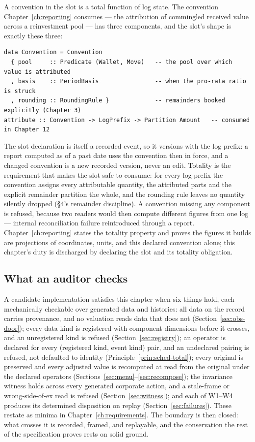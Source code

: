 A convention in the slot is a total function of log state. The convention
Chapter~\ref{ch:reporting} consumes --- the attribution of commingled received value across
a reinvestment pool --- has three components, and the slot's shape is exactly these three:

\begin{lstlisting}
data Convention = Convention
  { pool     :: Predicate (Wallet, Move)   -- the pool over which value is attributed
  , basis    :: PeriodBasis                -- when the pro-rata ratio is struck
  , rounding :: RoundingRule }             -- remainders booked explicitly (Chapter 3)
attribute :: Convention -> LogPrefix -> Partition Amount   -- consumed in Chapter 12
\end{lstlisting}

The slot declaration is itself a recorded event, so it versions with the log prefix: a
report computed as of a past date uses the convention then in force, and a changed
convention is a new recorded version, never an edit. Totality is the requirement that makes
the slot safe to consume: for every log prefix the convention assigns every attributable
quantity, the attributed parts and the explicit remainder partition the whole, and the
rounding rule leaves no quantity silently dropped (\S 4's remainder discipline). A
convention missing any component is refused, because two readers would then compute
different figures from one log --- internal reconciliation failure reintroduced through a
report. Chapter~\ref{ch:reporting} states the totality property and proves the figures it
builds are projections of coordinates, units, and this declared convention alone; this
chapter's duty is discharged by declaring the slot and its totality obligation.

\subsection{What an auditor checks}

A candidate implementation satisfies this chapter when six things hold, each mechanically
checkable over generated data and histories: all data on the record carries provenance,
and no valuation reads data that does not (Section~\ref{sec:obs-door}); every data kind
is registered with component dimensions before it crosses, and an unregistered kind is
refused (Section~\ref{sec:registry}); an operator is declared for every (registered kind,
event kind) pair, and an undeclared pairing is refused, not defaulted to identity
(Principle~\ref{prin:sched-total}); every original is preserved and every adjusted value is
recomputed at read from the original under the declared operators
(Sections~\ref{sec:menu}--\ref{sec:recompose}); the invariance witness holds across every
generated corporate action, and a stale-frame or wrong-side-of-ex read is refused
(Section~\ref{sec:witness}); and each of W1--W4 produces its determined disposition on
replay (Section~\ref{sec:failures}). These restate as minima in
Chapter~\ref{ch:requirements}. The boundary is then closed: what crosses it is recorded,
framed, and replayable, and the conservation the rest of the specification proves rests on
solid ground.
